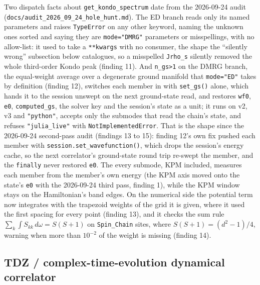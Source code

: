 \documentclass[11pt]{article}
\begin{document}
Two dispatch facts about \texttt{get\_kondo\_spectrum} date from the
2026-09-24 audit (\texttt{docs/audit\_2026\_09\_24\_hole\_hunt.md}).
The ED branch reads only its named parameters and raises
\texttt{TypeError} on any other keyword, naming the unknown ones sorted
and saying they are \texttt{mode="DMRG"} parameters or misspellings,
with no allow-list: it used to take a \texttt{**kwargs} with no
consumer, the shape the ``silently wrong'' subsection below catalogues,
so a misspelled \texttt{Jrho\_s} silently removed the whole
third-order Kondo peak (finding 11). And \texttt{n\_gs>1} on the DMRG
branch, the equal-weight average over a degenerate ground manifold that
\texttt{mode="ED"} takes by definition (finding 12), switches each
member in with \texttt{set\_gs()} alone, which hands it to the session
unswept on the next ground-state read, and restores \texttt{wf0},
\texttt{e0}, \texttt{computed\_gs}, the solver key and the session's
state as a unit; it runs on v2, v3 and \texttt{"python"}, accepts only
the submodes that read the chain's state, and refuses
\texttt{"julia\_live"} with \texttt{NotImplementedError}. That is the
shape since the 2026-09-24 second-pass audit (findings 13 to 15):
finding 12's own fix pushed each member with
\texttt{session.set\_wavefunction()}, which drops the session's energy
cache, so the next correlator's ground-state round trip re-swept the
member, and the \texttt{finally} never restored \texttt{e0}. The
every submode, KPM included, measures each member from the member's own
energy (the KPM axis moved onto the state's \texttt{e0} with the
2026-09-24 third pass, finding 1), while the KPM window stays on the
Hamiltonian's band edges. On the numerical side the potential term
now integrates with the trapezoid weights of the grid it is given, where
it used the first spacing for every point (finding 13), and it checks
the sum rule $\sum_k\int S_{kk}\,d\omega = S(S+1)$ on
\texttt{Spin\_Chain} sites, where $S(S+1) = (d^2-1)/4$, warning when
more than $10^{-2}$ of the weight is missing (finding 14).

\subsection{TDZ / complex-time-evolution dynamical correlator}
\end{document}
